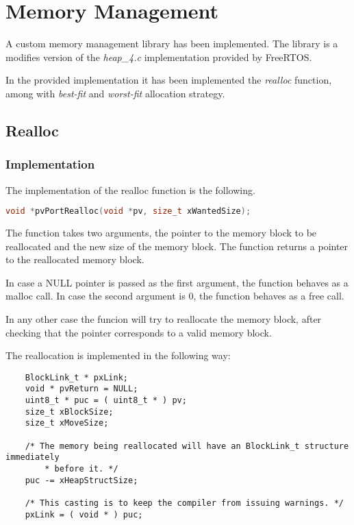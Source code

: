 \section{Memory Management}

A custom memory management library has been implemented. The library is a modifies version of the \textit{heap\_4.c} implementation provided by FreeRTOS.

In the provided implementation it has been implemented the \textit{realloc} function, among with \textit{best-fit} and \textit{worst-fit} allocation strategy.

\subsection{Realloc}
    \subsubsection{Implementation}
    The implementation of the realloc function is the following.

    \begin{lstlisting}[language=c,breaklines]
    void *pvPortRealloc(void *pv, size_t xWantedSize);
    \end{lstlisting}

    The function takes two arguments, the pointer to the memory block to be reallocated and the new size of the memory block. The function returns a pointer to the reallocated memory block.

    In case a NULL pointer is passed as the first argument, the function behaves as a malloc call. In case the second argument is 0, the function behaves as a free call.
    
    In any other case the funcion will try to reallocate the memory block, after checking that the pointer corresponds to a valid memory block.

    The reallocation is implemented in the following way:

    \begin{codebox}
    \begin{lstlisting}
    BlockLink_t * pxLink;
    void * pvReturn = NULL;
    uint8_t * puc = ( uint8_t * ) pv;
    size_t xBlockSize;
    size_t xMoveSize;

    /* The memory being reallocated will have an BlockLink_t structure immediately
        * before it. */
    puc -= xHeapStructSize;

    /* This casting is to keep the compiler from issuing warnings. */
    pxLink = ( void * ) puc;
    \end{lstlisting}
    \end{codebox}

